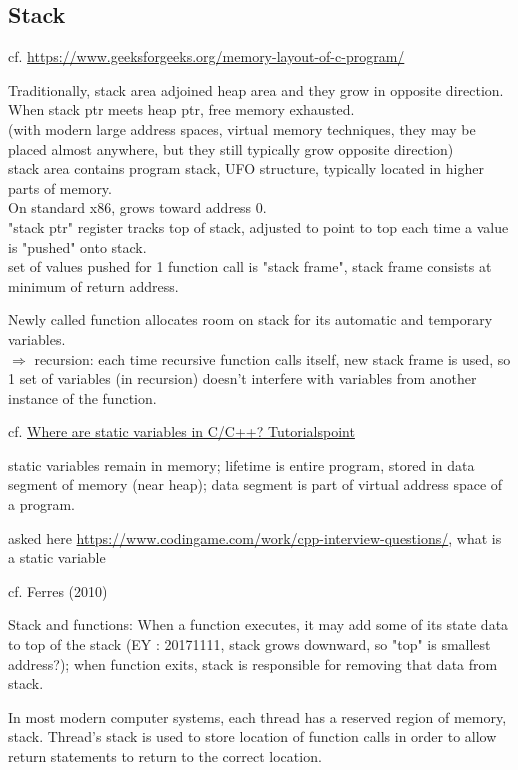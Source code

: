 \documentclass[10pt]{amsart}
\begin{document}
\begin{multicols*}{2}
\subsection{Stack}

cf. \url{https://www.geeksforgeeks.org/memory-layout-of-c-program/}

Traditionally, stack area adjoined heap area and they grow in opposite direction. \\
When stack ptr meets heap ptr, free memory exhausted. \\
(with modern large address spaces, virtual memory techniques, they may be placed almost anywhere, but they still typically grow opposite direction)  \\

stack area contains program stack, UFO structure, typically located in higher parts of memory. \\
On standard x86, grows toward address 0. \\
"stack ptr" register tracks top of stack, adjusted to point to top each time a value is "pushed" onto stack. \\
set of values pushed for 1 function call is "stack frame", stack frame consists at minimum of return address. 

Newly called function allocates room on stack for its automatic and temporary variables. \\
$\Longrightarrow$ recursion: each time recursive function calls itself, new stack frame is used, so 1 set of variables (in recursion) doesn't interfere with variables from another instance of the function. 

cf. \href{https://www.tutorialspoint.com/where-are-static-variables-stored-in-c-cplusplus}{Where are static variables in C/C++? Tutorialspoint}

static variables remain in memory; lifetime is entire program, stored in data segment of memory (near heap); data segment is part of virtual address space of a program.

asked here \url{https://www.codingame.com/work/cpp-interview-questions/}, what is a static variable


cf. Ferres (2010) \cite{Ferr2010}

Stack and functions: When a function executes, it may add some of its state data to top of the stack (EY : 20171111, stack grows downward, so "top" is smallest address?); when function exits, stack is responsible for removing that data from stack.  

In most modern computer systems, each thread has a reserved region of memory, stack.  Thread's stack is used to store location of function calls in order to allow return statements to return to the correct location.  


\end{multicols*}
\end{document}
